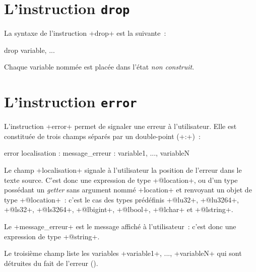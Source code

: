 
\section{L'instruction \texttt{drop}}

La syntaxe de l'instruction \ggsq+drop+ est la suivante~:

\begin{galgas4box}
drop variable, ...
\end{galgas4box}

Chaque variable nommée est placée dans l'état \emph{non construit}.








\section{L'instruction \texttt{error}}

L'instruction \ggsq+error+ permet de signaler une erreur à l'utilisateur. Elle est constituée de trois champs séparés par un double-point (\ggsq+:+)~:

\begin{galgas4box}
error localisation : message_erreur : variable1, ..., variableN
\end{galgas4box}



Le champ \ggsq+localisation+ signale à l'utilisateur la position de l'erreur dans le texte source. C'est donc une expression de type \ggsq+@location+, ou d'un type possédant un \emph{getter} sans argument nommé \ggsq+location+ et renvoyant un objet de type \ggsq+@location+~: c'est le cas des types prédéfinis \ggsq+@lu32+, \ggsq+@lu3264+, \ggsq+@ls32+, \ggsq+@ls3264+, \ggsq+@lbigint+, \ggsq+@lbool+, \ggsq+@lchar+ et \ggsq+@lstring+.

Le \ggsq+message_erreur+ est le message affiché à l'utilisateur~: c'est donc une expression de type \ggsq+@string+.

Le troisième champ liste les variables \ggsq+variable1+, ..., \ggsq+variableN+ qui sont détruites du fait de l'erreur ().

